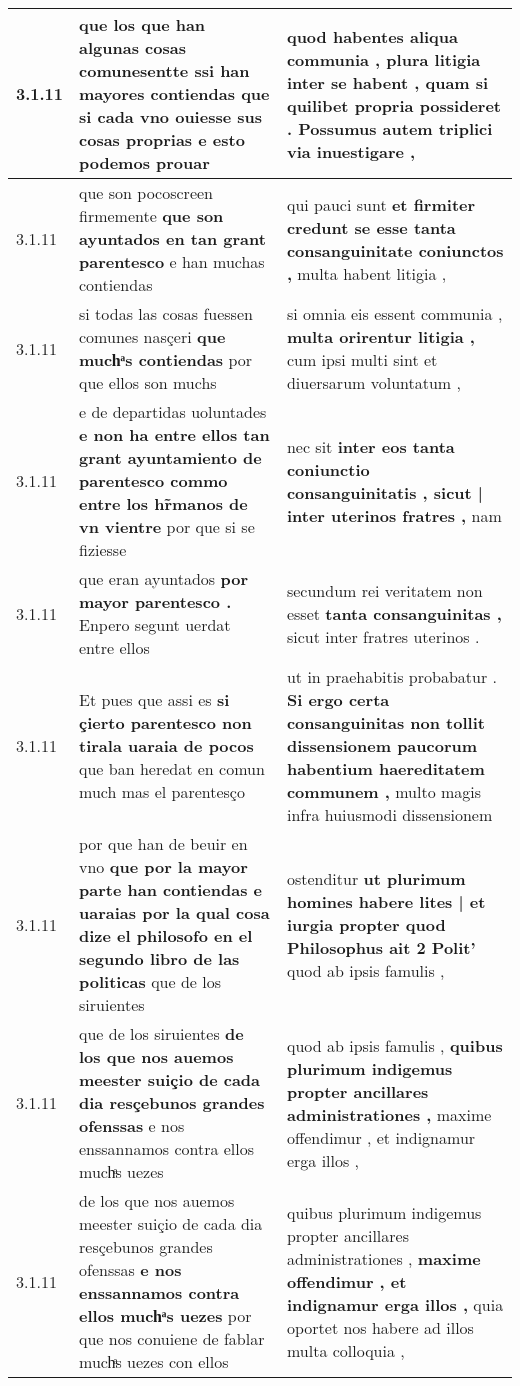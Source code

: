 \begin{tabular}{|p{1cm}|p{6.5cm}|p{6.5cm}|}
3.1.11 & que los que han algunas cosas comunesentte \textbf{ ssi han mayores contiendas que si cada vno ouiesse sus cosas proprias } e esto podemos prouar & quod habentes aliqua communia , \textbf{ plura litigia inter se habent , } quam si quilibet propria possideret . Possumus autem triplici via inuestigare , \\\hline
3.1.11 & que son pocoscreen firmemente \textbf{ que son ayuntados en tan grant parentesco } e han muchas contiendas & qui pauci sunt \textbf{ et firmiter credunt se esse tanta consanguinitate coniunctos , } multa habent litigia , \\\hline
3.1.11 & si todas las cosas fuessen comunes nasçeri \textbf{ que muchͣs contiendas } por que ellos son muchs & si omnia eis essent communia , \textbf{ multa orirentur litigia , } cum ipsi multi sint et diuersarum voluntatum , \\\hline
3.1.11 & e de departidas uoluntades \textbf{ e non ha entre ellos tan grant ayuntamiento de parentesco commo entre los hr̃manos de vn vientre } por que si se fiziesse & nec sit \textbf{ inter eos tanta coniunctio consanguinitatis , sicut | inter uterinos fratres , } nam \\\hline
3.1.11 & que eran ayuntados \textbf{ por mayor parentesco . } Enpero segunt uerdat entre ellos & secundum rei veritatem non esset \textbf{ tanta consanguinitas , } sicut inter fratres uterinos . \\\hline
3.1.11 & Et pues que assi es \textbf{ si çierto parentesco non tirala uaraia de pocos } que ban heredat en comun much mas el parentesço & ut in praehabitis probabatur . \textbf{ Si ergo certa consanguinitas non tollit dissensionem paucorum habentium haereditatem communem , } multo magis infra huiusmodi dissensionem \\\hline
3.1.11 & por que han de beuir en vno \textbf{ que por la mayor parte han contiendas e uaraias por la qual cosa dize el philosofo en el segundo libro de las politicas } que de los siruientes & ostenditur \textbf{ ut plurimum homines habere lites | et iurgia propter quod Philosophus ait 2 Polit’ } quod ab ipsis famulis , \\\hline
3.1.11 & que de los siruientes \textbf{ de los que nos auemos meester suiçio de cada dia resçebunos grandes ofenssas } e nos enssannamos contra ellos muchͣs uezes & quod ab ipsis famulis , \textbf{ quibus plurimum indigemus propter ancillares administrationes , } maxime offendimur , et indignamur erga illos , \\\hline
3.1.11 & de los que nos auemos meester suiçio de cada dia resçebunos grandes ofenssas \textbf{ e nos enssannamos contra ellos muchͣs uezes } por que nos conuiene de fablar muchͣs uezes con ellos & quibus plurimum indigemus propter ancillares administrationes , \textbf{ maxime offendimur , et indignamur erga illos , } quia oportet nos habere ad illos multa colloquia , \\\hline

\end{tabular}

